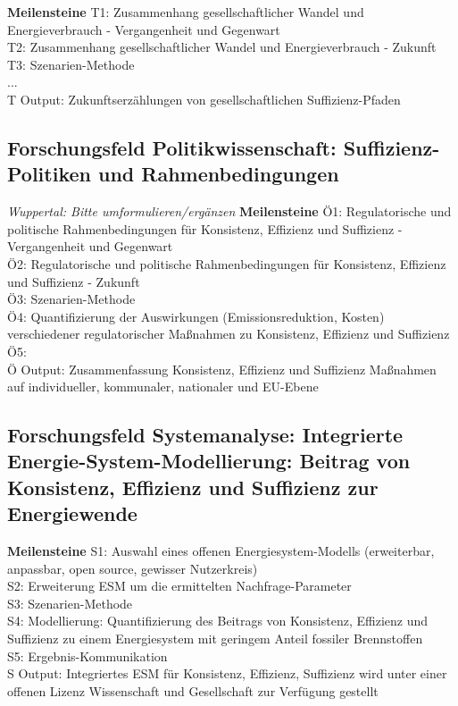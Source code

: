 \documentclass[a4paper,11pt,twoside]{scrartcl}
\begin{document}
\textbf{Meilensteine}
T1: Zusammenhang gesellschaftlicher Wandel und Energieverbrauch - Vergangenheit und Gegenwart\\
T2: Zusammenhang gesellschaftlicher Wandel und Energieverbrauch - Zukunft\\
T3: Szenarien-Methode\\
...\\
T Output: Zukunftserzählungen von gesellschaftlichen Suffizienz-Pfaden

\subsection*{Forschungsfeld Politikwissenschaft: Suffizienz-Politiken und Rahmenbedingungen}
\textit{Wuppertal: Bitte umformulieren/ergänzen}
\textbf{Meilensteine}
Ö1: Regulatorische und politische Rahmenbedingungen für Konsistenz, Effizienz und Suffizienz - Vergangenheit und Gegenwart\\
Ö2: Regulatorische und politische Rahmenbedingungen für Konsistenz, Effizienz und Suffizienz - Zukunft\\
Ö3: Szenarien-Methode\\
Ö4: Quantifizierung der Auswirkungen (Emissionsreduktion, Kosten) verschiedener regulatorischer Maßnahmen zu Konsistenz, Effizienz und Suffizienz\\
Ö5: \\
Ö Output: Zusammenfassung Konsistenz, Effizienz und Suffizienz Maßnahmen auf individueller, kommunaler, nationaler und EU-Ebene

\subsection*{Forschungsfeld Systemanalyse: Integrierte Energie-System-Modellierung: Beitrag von Konsistenz, Effizienz und Suffizienz zur Energiewende}

\textbf{Meilensteine}
S1: Auswahl eines offenen Energiesystem-Modells (erweiterbar, anpassbar, open source, gewisser Nutzerkreis)\\
S2: Erweiterung ESM um die ermittelten Nachfrage-Parameter\\
S3: Szenarien-Methode\\
S4: Modellierung: Quantifizierung des Beitrags von Konsistenz, Effizienz und Suffizienz zu einem Energiesystem mit geringem Anteil fossiler Brennstoffen\\
S5: Ergebnis-Kommunikation\\
S Output: Integriertes ESM für Konsistenz, Effizienz, Suffizienz wird unter einer offenen Lizenz Wissenschaft und Gesellschaft zur Verfügung gestellt
\end{document}
